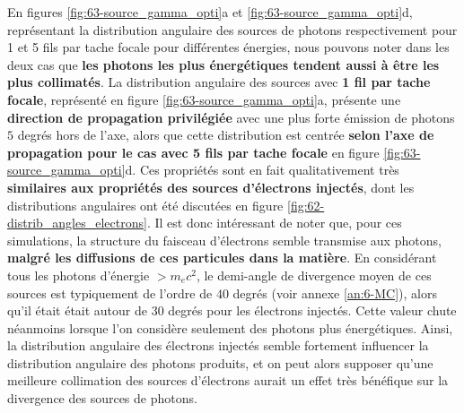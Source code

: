 \begin{refsection}
En figures \ref{fig:63-source_gamma_opti}a et \ref{fig:63-source_gamma_opti}d, représentant la distribution angulaire des sources de photons respectivement pour 1 et 5 fils par tache focale pour différentes énergies, nous pouvons noter dans les deux cas que \textbf{les photons les plus énergétiques tendent aussi à être les plus collimatés}. La distribution angulaire des sources avec \textbf{1 fil par tache focale}, représenté en figure \ref{fig:63-source_gamma_opti}a, présente une \textbf{direction de propagation privilégiée} avec une plus forte émission de photons $5$ degrés hors de l'axe, alors que cette distribution est centrée \textbf{selon l'axe de propagation pour le cas avec 5 fils par tache focale} en figure \ref{fig:63-source_gamma_opti}d. Ces propriétés sont en fait qualitativement très \textbf{similaires aux propriétés des sources d'électrons injectés}, dont les distributions angulaires ont été discutées en figure \ref{fig:62-distrib_angles_electrons}. Il est donc intéressant de noter que, pour ces simulations, la structure du faisceau d'électrons semble transmise aux photons, \textbf{malgré les diffusions de ces particules dans la matière}. En considérant tous les photons d'énergie $> m_e c^2$, le demi-angle de divergence moyen de ces sources est typiquement de l'ordre de $40$ degrés (voir annexe \ref{an:6-MC}), alors qu'il était était autour de $30$ degrés pour les électrons injectés. Cette valeur chute néanmoins lorsque l'on considère seulement des photons plus énergétiques. Ainsi, la distribution angulaire des électrons injectés semble fortement influencer la distribution angulaire des photons produits, et on peut alors supposer qu'une meilleure collimation des sources d'électrons aurait un effet très bénéfique sur la divergence des sources de photons.


\end{refsection}
